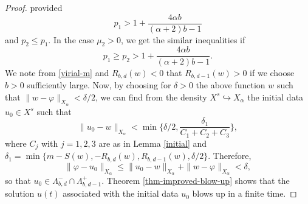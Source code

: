 \documentclass[10pt]{article}
\numberwithin{equation}{section}
\newcommand{\ff}{\varphi}
\newcommand{\x}{{X_\alpha}}
\newcommand{\al}{\alpha}
\newcommand{\rrr}{{R_{b,d}}}
\begin{document}
\begin{proof}
		provided
		\[
		p_1>1+\frac{4\al b}{(\al+2)b-1}
		\]
		and $p_2\leq p_1$. In the case $\mu_2>0$, we get the similar inequalities if 
		\[
		p_1\geq p_2>1+\frac{4\al b}{(\al+2)b-1}.
		\]
		We note from \eqref{virial-m} and $\rrr(w)<0$ that  $R_{b,d-1}(w)>0$ if we choose $b>0$ sufficiently large. Now, by choosing for $\delta>0$ the above function $w$ such that $\|w-\ff\|_\x<\delta/2$, we can find from the density $X^s\hookrightarrow\x$ the initial data $u_0\in X^s$ such that 
		\[
		\|u_0-w\|_\x<\min\{\delta/2,\frac{\delta_1}{C_1+C_2+C_3}\},
		\]
		where $C_j$ with $j=1,2,3$ are as in Lemma \ref{initial} and $\delta_1=\min\{m-S(w),-\rrr(w),R_{b,d-1}(w),\delta/2\}$. Therefore, 
		\[
		\|\ff-u_0\|_\x\leq\|u_0-w\|_\x+\|w-\ff\|_\x<\delta,
		\]
		so that $u_0\in\Lambda_{b,d}^-\cap\Lambda_{b,d-1}^+$.
		Theorem \ref{thm-improved-blow-up} shows that the solution $u(t)$ associated with the initial data $u_0$ blows up in a finite time.
	\end{proof}
	
\end{document}
